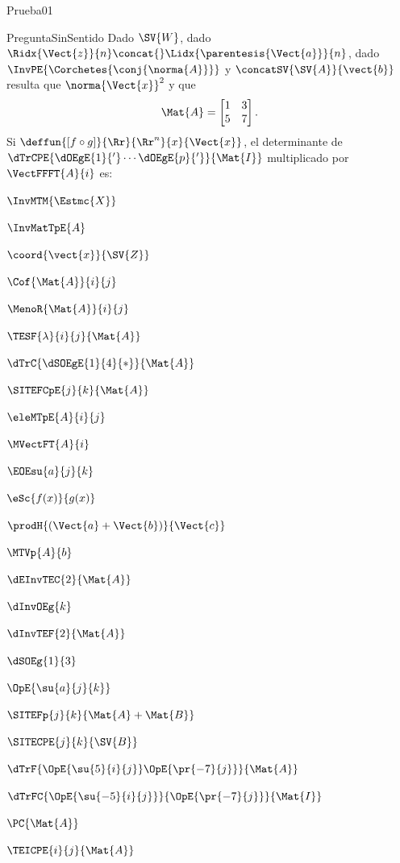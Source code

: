 \documentclass[10pt]{article}
\begin{document}

\begin{quiz}{Prueba01}
  
  \begin{multi}{PreguntaSinSentido}
    Dado $\SV{W}$, dado
    $\Ridx{\Vect{z}}{n}\concat{}\Lidx{\parentesis{\Vect{a}}}{n}$, dado
    $\InvPE{\Corchetes{\conj{\norma{A}}}}$ y
    $\concatSV{\SV{A}}{\vect{b}}$ resulta que $\norma{\Vect{x}}^2$ y que
    \[
      \Mat{A}=
      \begin{bmatrix}
        1&3\\
        5&7
      \end{bmatrix}.
    \]
    Si $\deffun{[f \circ g ]}{\Rr}{\Rr^{n}}{x}{\Vect{x}}$, el
    determinante de $\dTrCPE{\dOEgE{1}{'}\cdots\dOEgE{p}{'}}{\Mat{I}}$
    multiplicado por $\VectFFFT{A}{i}$ es:
    \item $\InvMTM{\Estmc{X}}$
    \item $\InvMatTpE{A}$
    \item $\coord{\vect{x}}{\SV{Z}}$
    \item $\Cof{\Mat{A}}{i}{j}$
    \item $\MenoR{\Mat{A}}{i}{j}$
    \item $\TESF{\lambda}{i}{j}{\Mat{A}}$
    \item * $\dTrC{\dSOEgE{1}{4}{*}}{\Mat{A}}$
    \item * $\SITEFCpE{j}{k}{\Mat{A}}$
    \item $\eleMTpE{A}{i}{j}$
    \item $\MVectFT{A}{i}$
    \item $\EOEsu{a}{j}{k}$
    \item $\eSc{f(x)}{g(x)}$
    \item $\prodH{(\Vect{a}+\Vect{b})}{\Vect{c}}$
    \item $\MTVp{A}{b}$
    \item $\dEInvTEC{2}{\Mat{A}}$
    \item $\dInvOEg{k}$
    \item $\dInvTEF{2}{\Mat{A}}$
    \item $\dSOEg{1}{3}$
    \item $\OpE{\su{a}{j}{k}}$
    \item $\SITEFp{j}{k}{\Mat{A}+\Mat{B}}$
    \item $\SITECPE{j}{k}{\SV{B}}$
    \item $\dTrF{\OpE{\su{5}{i}{j}}\OpE{\pr{-7}{j}}}{\Mat{A}}$
    \item $\dTrFC{\OpE{\su{-5}{i}{j}}}{\OpE{\pr{-7}{j}}}{\Mat{I}}$
    \item $\PC{\Mat{A}}$
    \item $\TEICPE{i}{j}{\Mat{A}}$
    \end{multi}
    
  \end{quiz}
  
\end{document}
